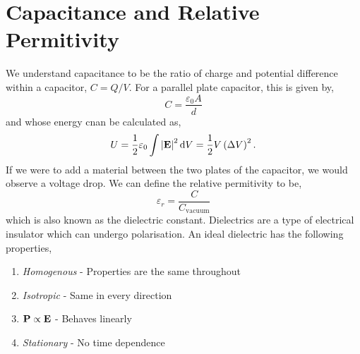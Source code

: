 \documentclass{book}
\begin{document}
\section{Capacitance and Relative Permitivity}
We understand capacitance to be the ratio of charge and potential difference within a capacitor, $C = Q/V$. For a parallel plate capacitor, this is given by,
\begin{equation}
	C = \frac{\varepsilon_0 A}{d}
\end{equation}
and whose energy cnan be calculated as,
\begin{equation}
	U = \frac{1}{2}\varepsilon_0\int \left|\vb{E}\right|^2\dd{V} = \frac{1}{2}V\left(\Delta V\right)^2.
\end{equation}
If we were to add a material between the two plates of the capacitor, we would observe a voltage drop. We can define the relative permitivity to be,
\begin{equation}
	\varepsilon_r = \frac{C}{C_{\text{vacuum}}}
\end{equation}
which is also known as the dielectric constant. Dielectrics are a type of electrical insulator which can undergo polarisation. An ideal dielectric has the following properties,
\begin{enumerate}
	\item \textit{Homogenous} - Properties are the same throughout
	\item \textit{Isotropic} - Same in every direction
	\item \textit{$\vb{P} \propto \vb{E}$} - Behaves linearly
	\item \textit{Stationary} - No time dependence
\end{enumerate}
\end{document}
